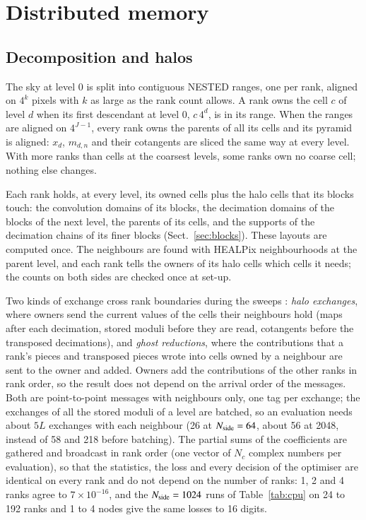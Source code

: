 \documentclass{aa}
\newcommand{\nside}{N_{\rm side}}
\begin{document}
\section{Distributed memory}
\label{sec:mpi}

\subsection{Decomposition and halos}

The sky at level 0 is split into contiguous NESTED ranges, one per rank, aligned on $4^k$ pixels with $k$ as large as the rank count allows. A rank owns the cell $c$ of level $d$ when its first descendant at level 0, $c\,4^d$, is in its range. When the ranges are aligned on $4^{J-1}$, every rank owns the parents of all its cells and its pyramid is aligned: $x_d$, $m_{d,n}$ and their cotangents are sliced the same way at every level. With more ranks than cells at the coarsest levels, some ranks own no coarse cell; nothing else changes.

Each rank holds, at every level, its owned cells plus the halo cells that its blocks touch: the convolution domains of its blocks, the decimation domains of the blocks of the next level, the parents of its cells, and the supports of the decimation chains of its finer blocks (Sect.~\ref{sec:blocks}). These layouts are computed once. The neighbours are found with HEALPix neighbourhoods at the parent level, and each rank tells the owners of its halo cells which cells it needs; the counts on both sides are checked once at set-up.

Two kinds of exchange cross rank boundaries during the sweeps \citep[the ghost-cell pattern of domain decomposition;][]{smith1996}: \emph{halo exchanges}, where owners send the current values of the cells their neighbours hold (maps after each decimation, stored moduli before they are read, cotangents before the transposed decimations), and \emph{ghost reductions}, where the contributions that a rank's pieces and transposed pieces wrote into cells owned by a neighbour are sent to the owner and added. Owners add the contributions of the other ranks in rank order, so the result does not depend on the arrival order of the messages. Both are point-to-point messages with neighbours only, one tag per exchange; the exchanges of all the stored moduli of a level are batched, so an evaluation needs about $5L$ exchanges with each neighbour (26 at $\nside=64$, about 56 at 2048, instead of 58 and 218 before batching). The partial sums of the coefficients are gathered and broadcast in rank order (one vector of $N_c$ complex numbers per evaluation), so that the statistics, the loss and every decision of the optimiser are identical on every rank and do not depend on the number of ranks: 1, 2 and 4 ranks agree to $7\times10^{-16}$, and the $\nside=1024$ runs of Table~\ref{tab:cpu} on 24 to 192 ranks and 1 to 4 nodes give the same losses to 16 digits.
\end{document}
